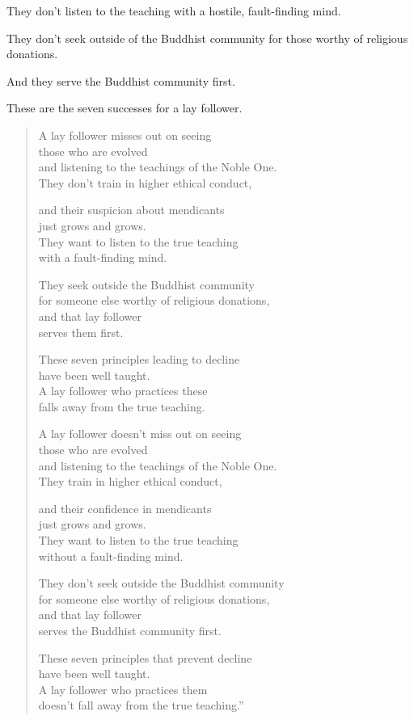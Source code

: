 \documentclass[12pt,openany]{book}%
\begin{document}
They don’t listen to the teaching with a hostile, fault-finding mind. 

They don’t seek outside of the Buddhist community for those worthy of religious donations. 

And they serve the Buddhist community first. 

These are the seven successes for a lay follower. 

\begin{verse}%
A lay follower misses out on seeing \\
those who are evolved \\
and listening to the teachings of the Noble One. \\
They don’t train in higher ethical conduct, 

and their suspicion about mendicants \\
just grows and grows. \\
They want to listen to the true teaching \\
with a fault-finding mind. 

They seek outside the Buddhist community \\
for someone else worthy of religious donations, \\
and that lay follower \\
serves them first. 

These seven principles leading to decline \\
have been well taught. \\
A lay follower who practices these \\
falls away from the true teaching. 

A lay follower doesn’t miss out on seeing \\
those who are evolved \\
and listening to the teachings of the Noble One. \\
They train in higher ethical conduct, 

and their confidence in mendicants \\
just grows and grows. \\
They want to listen to the true teaching \\
without a fault-finding mind. 

They don’t seek outside the Buddhist community \\
for someone else worthy of religious donations, \\
and that lay follower \\
serves the Buddhist community first. 

These seven principles that prevent decline \\
have been well taught. \\
A lay follower who practices them \\
doesn’t fall away from the true teaching.” 

%
\end{verse}
\end{document}

